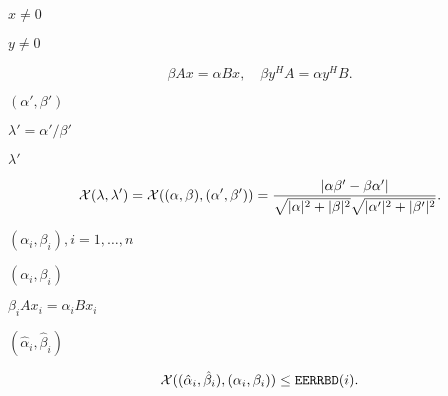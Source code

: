 {\newpage\clearpage
{}%
$x \neq 0$%
\lthtmlinlinemathZ
\lthtmlcheckvsize\clearpage}

{\newpage\clearpage
{}%
$y \neq 0$%
\lthtmlinlinemathZ
\lthtmlcheckvsize\clearpage}

{\newpage\clearpage
{}%
\begin{displaymath}
\beta A x = \alpha B x, \quad \beta y^H A  = \alpha y^H B .
\end{displaymath}%
\lthtmldisplayZ
\lthtmlcheckvsize\clearpage}

{\newpage\clearpage
{}%
$(\alpha',\beta')$%
\lthtmlinlinemathZ
\lthtmlcheckvsize\clearpage}

{\newpage\clearpage
{}%
$\lambda' = \alpha'/\beta'$%
\lthtmlinlinemathZ
\lthtmlcheckvsize\clearpage}

{\newpage\clearpage
{}%
$\lambda'$%
\lthtmlinlinemathZ
\lthtmlcheckvsize\clearpage}

{\newpage\clearpage
{}%
\begin{displaymath}
{\cal X}( \lambda,\lambda') =
{\cal X}((\alpha, \beta), (\alpha',\beta')) = \frac{|\alpha \beta' -
\beta \alpha' |}{\sqrt{|\alpha|^2 + |\beta|^2} \sqrt{|\alpha'|^2 + |\beta'|^2}}.
\end{displaymath}%
\lthtmldisplayZ
\lthtmlcheckvsize\clearpage}

{\newpage\clearpage
{}%
$({\alpha}_i, {\beta}_i), i = 1, \ldots, n$%
\lthtmlinlinemathZ
\lthtmlcheckvsize\clearpage}

{\newpage\clearpage
{}%
$({\alpha}_i, {\beta}_i)$%
\lthtmlinlinemathZ
\lthtmlcheckvsize\clearpage}

{\newpage\clearpage
{}%
${\beta}_i A x_i = {\alpha}_i B x_i$%
\lthtmlinlinemathZ
\lthtmlcheckvsize\clearpage}

{\newpage\clearpage
{}%
$({\hat{\alpha}}_i, {\hat{\beta}}_i)$%
\lthtmlinlinemathZ
\lthtmlcheckvsize\clearpage}

{\newpage\clearpage
{}%
\begin{displaymath}
{\cal X}(({\hat{\alpha}}_i, {\hat{\beta}}_i), ({\alpha}_i, {\beta}_i)) \leq
{\tt EERRBD}(i) .
\end{displaymath}%
\lthtmldisplayZ
\lthtmlcheckvsize\clearpage}

